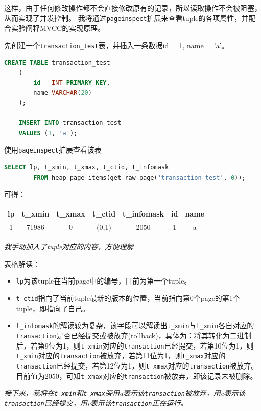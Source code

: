 \documentclass[a4paper,10pt]{ctexart}
\begin{document}
这样，由于任何修改操作都不会直接修改原有的记录，所以读取操作不会被阻塞，从而实现了并发控制。
我将通过\texttt{pageinspect}扩展来查看tuple的各项属性，并配合实验阐释MVCC的实现原理。

先创建一个\texttt{transaction\_test}表，并插入一条数据{id = 1, name = 'a'}。
\begin{lstlisting}[language=SQL]
    CREATE TABLE transaction_test
    (
        id   INT PRIMARY KEY,
        name VARCHAR(20)
    );

    INSERT INTO transaction_test
    VALUES (1, 'a');
\end{lstlisting}

使用\texttt{pageinspect}扩展查看该表
\begin{center}
    \begin{lstlisting}[language=SQL]
        SELECT lp, t_xmin, t_xmax, t_ctid, t_infomask
        FROM heap_page_items(get_raw_page('transaction_test', 0));
    \end{lstlisting}
\end{center}

可得：
\begin{center}
    \begin{tabular}{ccccccc}
        \toprule
        lp & t\_xmin & t\_xmax & t\_ctid & t\_infomask & id & name \\
        \midrule
        1 & 71986 & 0 & (0,1) & 2050 & 1 & a \\
        \bottomrule
    \end{tabular}
\end{center}
\textit{我手动加入了tuple对应的内容，方便理解}

表格解读：
\begin{itemize}
    \item \texttt{lp}为该tuple在当前page中的编号，目前为第一个tuple。
    \item \texttt{t\_ctid}指向了当前tuple最新的版本的位置，当前指向第0个page的第1个tuple，即指向了自己。
    \item \texttt{t\_infomask}的解读较为复杂，该字段可以解读出\texttt{t\_xmin}与\texttt{t\_xmin}各自对应的\texttt{transaction}是否已经提交或被放弃(rollback)，具体为：将其转化为二进制后，若第9位为1，则\texttt{t\_xmin}对应的\texttt{transaction}已经提交，若第10位为1，则\texttt{t\_xmin}对应的\texttt{transaction}被放弃，若第11位为1，则\texttt{t\_xmax}对应的\texttt{transaction}已经提交，若第12位为1，则\texttt{t\_xmax}对应的\texttt{transaction}被放弃。
          目前值为2050，可知\texttt{t\_xmax}对应的\texttt{transaction}被放弃，即该记录未被删除。
\end{itemize}
\textit{接下来，我将在\texttt{t\_xmin}和\texttt{t\_xmax}旁用a表示该\texttt{transaction}被放弃，用c表示该\texttt{transaction}已经提交，用r表示该\texttt{transaction}正在运行。}
\end{document}
